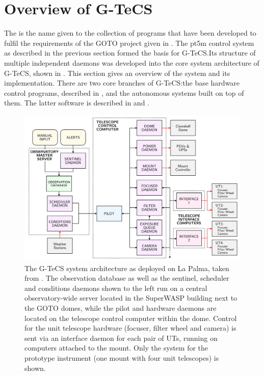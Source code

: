 
\section{Overview of G-TeCS}
\label{sec:gtecs}


\begin{colsection}

The  is the name given to the collection of programs that have been developed to fulfil the requirements of the GOTO project given in . The pt5m control system as described in the previous section formed the basis for G-TeCS.\@ Its structure of multiple independent daemons was developed into the core system architecture of G-TeCS, shown in . This section gives an overview of the system and its implementation. There are two core branches of G-TeCS:\@ the base hardware control programs, described in , and the autonomous systems built on top of them. The latter software is described in  and .

\begin{figure}[p]
    \begin{center}
        \includegraphics[width=\linewidth]{images/flow.pdf}
    \end{center}
    \caption[The G-TeCS system architecture]{
        The G-TeCS system architecture as deployed on La Palma, taken from \citet{Dyer}. The observation database as well as the sentinel, scheduler and conditions daemons shown to the left run on a central observatory-wide server located in the SuperWASP building next to the GOTO domes, while the pilot and hardware daemons are located on the telescope control computer within the dome. Control for the unit telescope hardware (focuser, filter wheel and camera) is sent via an interface daemon for each pair of UTs, running on computers attached to the mount. Only the system for the prototype instrument (one mount with four unit telescopes) is shown.
    }\label{fig:flow}
\end{figure}

\end{colsection}

